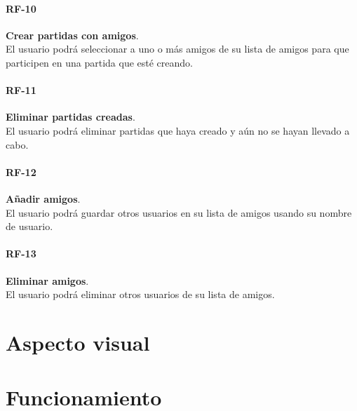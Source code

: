             \paragraph{RF-10}

                \textbf{Crear partidas con amigos}. \\
                El usuario podrá seleccionar a uno o más amigos de su lista de amigos para que participen en una partida que esté creando.

            \paragraph{RF-11}

                \textbf{Eliminar partidas creadas}. \\
                El usuario podrá eliminar partidas que haya creado y aún no se hayan llevado a cabo.

            \paragraph{RF-12}

                \textbf{Añadir amigos}. \\
                El usuario podrá guardar otros usuarios en su lista de amigos usando su nombre de usuario.

            \paragraph{RF-13}

                \textbf{Eliminar amigos}. \\
                El usuario podrá eliminar otros usuarios de su lista de amigos.


    \section{Aspecto visual}


    \section{Funcionamiento}



\cleardoublepage



